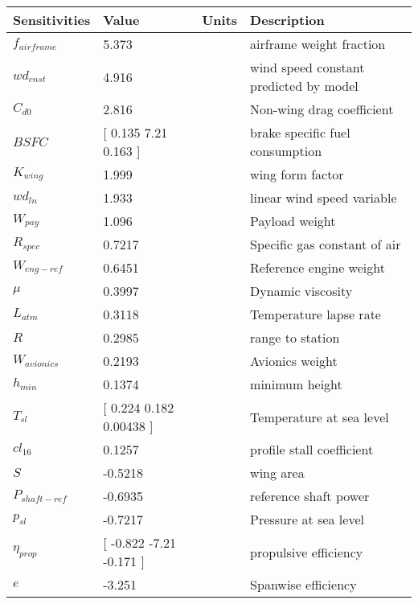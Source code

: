{\footnotesize
\begin{longtable}{llll}
\toprule
Sensitivities & Value & Units & Description \\
\midrule
$f_{airframe}$ & 5.373 & $ $ & airframe weight fraction \\
$wd_{cnst}$ & 4.916 & $ $ & wind speed constant predicted by model \\
$C_{d0}$ & 2.816 & $ $ & Non-wing drag coefficient \\
$BSFC$ & [ 0.135     7.21      0.163    ] & $ $ & brake specific fuel consumption \\
$K_{wing}$ & 1.999 & $ $ & wing form factor \\
$wd_{ln}$ & 1.933 & $ $ & linear wind speed variable \\
$W_{pay}$ & 1.096 & $ $ & Payload weight \\
$R_{spec}$ & 0.7217 & $ $ & Specific gas constant of air \\
$W_{eng-ref}$ & 0.6451 & $ $ & Reference engine weight \\
$\mu$ & 0.3997 & $ $ & Dynamic viscosity \\
$L_{atm}$ & 0.3118 & $ $ & Temperature lapse rate \\
$R$ & 0.2985 & $ $ & range to station \\
$W_{avionics}$ & 0.2193 & $ $ & Avionics weight \\
$h_{min}$ & 0.1374 & $ $ & minimum height \\
$T_{sl}$ & [ 0.224     0.182     0.00438  ] & $ $ & Temperature at sea level \\
$cl_{16}$ & 0.1257 & $ $ & profile stall coefficient \\
$S$ & -0.5218 & $ $ & wing area \\
$P_{shaft-ref}$ & -0.6935 & $ $ & reference shaft power \\
$p_{sl}$ & -0.7217 & $ $ & Pressure at sea level \\
$\eta_{prop}$ & [ -0.822    -7.21     -0.171   ] & $ $ & propulsive efficiency \\
$e$ & -3.251 & $ $ & Spanwise efficiency \\
\bottomrule
\end{longtable}}
